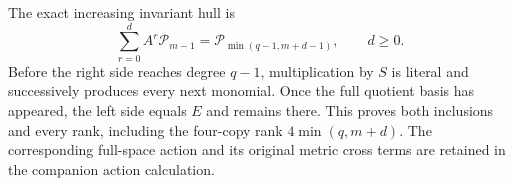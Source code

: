 The exact increasing invariant hull is
\[
 \sum_{r=0}^{d}A^r\mathcal P_{m-1}
      =\mathcal P_{\min(q-1,m+d-1)},\qquad d\ge0.
 \tag{COI17}
\]
Before the right side reaches degree $q-1$, multiplication by $S$
is literal and successively produces every next monomial. Once
the full quotient basis has appeared, the left side equals $E$
and remains there. This proves both inclusions and every rank,
including the four-copy rank $4\min(q,m+d)$.
The corresponding full-space action and its original metric cross
terms are retained in the companion action calculation.
